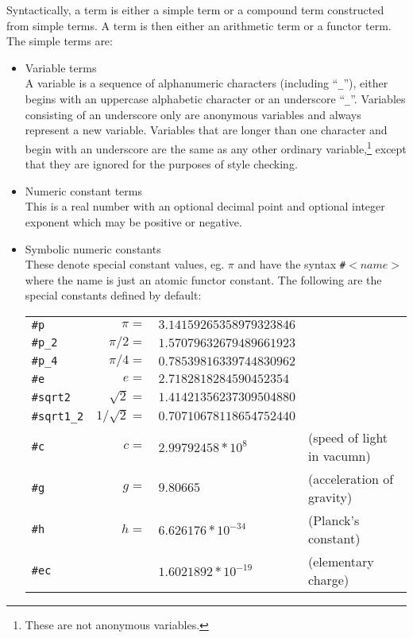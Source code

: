 Syntactically, 
a term is either a simple term or a compound term constructed from
simple terms.
A term is then either an arithmetic term or a functor term.
The simple terms are:
\begin{itemize}
\item Variable terms \\
A variable is a sequence of alphanumeric
characters (including ``{\tt \_}''),
either begins with an uppercase alphabetic character or an
underscore ``{\tt \_}''. Variables consisting of an
underscore only are anonymous variables and always represent a new variable.
Variables that are longer than one character and begin with an underscore
are the same as any other ordinary variable,\footnote{ 
These are not anonymous variables.} except that they are ignored
for the purposes of style checking.

\item Numeric constant terms\\
\chgbarbegin
This is a real number with an optional decimal point and optional integer
exponent which may be positive or negative.
\chgbarend

\item Symbolic numeric constants\\
\chgbarbegin
These denote special constant values, eg. $\pi$ and have the
syntax {\tt \#}$<\!name\!>$ where the name is just an
atomic functor constant. The following are the special constants
defined by default:

\begin{tabular}{lrll}
{\tt \#p} & $\pi = $ & $ 3.14159265358979323846 $ \\
{\tt \#p\_2} & $\pi/2 = $ & $ 1.57079632679489661923 $ \\
{\tt \#p\_4} & $\pi/4 = $ & $ 0.78539816339744830962 $ \\
{\tt \#e} & $e = $ & $ 2.7182818284590452354 $ \\
{\tt \#sqrt2} & $\sqrt{2} = $ & $ 1.41421356237309504880 $ \\
{\tt \#sqrt1\_2} & $1/\sqrt{2} = $ & $ 0.70710678118654752440 $ \\
{\tt \#c} & $c = $ & $ 2.99792458*10^8$ & (speed of light in vacumn) \\
{\tt \#g} & $g = $ & $ 9.80665$ & (acceleration of gravity) \\
{\tt \#h} & $h = $ & $ 6.626176*10^{-34}$ & (Planck's constant) \\
{\tt \#ec} & & $1.6021892*10^{-19}$ & (elementary charge) \\
\end{tabular}


\end{itemize}

